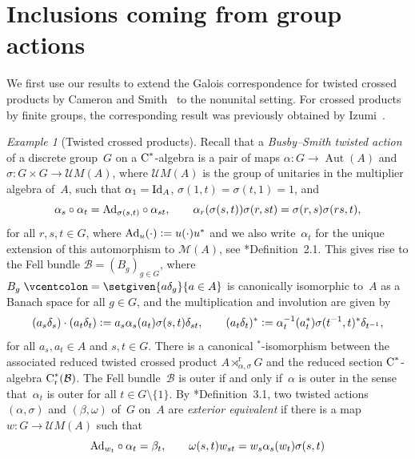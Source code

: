\documentclass[a4paper]{amsart}
\theoremstyle{plain}
\theoremstyle{definition}
\theoremstyle{remark}
\newtheorem{example}[theorem]{Example}
\numberwithin{theorem}{section}
\numberwithin{equation}{section}
\DeclareMathOperator{\Aut}{Aut}%
\newcommand*{\nb}{\nobreakdash}
\newcommand*{\Star}{\(^*\)\nobreakdash-}
\newcommand*{\red}{\mathrm{r}}%
\newcommand*{\Cst}{\textup C^*}%
\newcommand*{\Mult}{\mathcal M}%
\newcommand*{\UMult}{\mathcal UM}%
\newcommand*{\Id}{\textup{Id}}%
\newcommand*{\Ad}{\textup{Ad}}%
\newcommand*{\B}{\mathcal B}%
\newcommand*{\defeq}{\mathrel{\vcentcolon=}}%
\begin{document}
\section{Inclusions coming from group actions}
\label{sec:group_actions}

We first use our results to extend the Galois
correspondence for twisted crossed products by Cameron and
Smith~\cite{Cameron-Smith:Galois_reduced} to the nonunital setting.
For crossed products by finite groups, the corresponding result was
previously obtained by Izumi~\cite{Izumi:Inclusions_simple}.

\begin{example}[Twisted crossed products]
  \label{ex:twisted_actions}
  Recall that a \emph{Busby--Smith twisted action} of a discrete
  group~\(G\) on a \(\Cst\)\nb-algebra is a pair of maps
  \(\alpha\colon G\to \Aut(A)\) and \(\sigma\colon G\times G\to
  \UMult(A)\), where \(\UMult(A)\) is the group of unitaries in the
  multiplier algebra of~\(A\), such that \(\alpha_1=\Id_A\),
  \(\sigma(1,t)=\sigma(t,1)=1\), and
  \[
    \alpha_s\circ \alpha_t
    = \Ad_{\sigma(s,t)}\circ\alpha_{s t}, \qquad
    \alpha_r (\sigma(s,t)) \sigma(r,s t)
    =  \sigma(r,s) \sigma(rs,t),
  \]
  for all \(r,s,t\in G\), where \(\Ad_u(\cdot)\defeq u(\cdot)u^*\) and
  we also write~\(\alpha_t\) for the unique extension of this automorphism
  to \(\Mult(A)\), see
  \cite{Packer-Raeburn:Stabilisation}*{Definition~2.1}.
  This gives rise to the Fell bundle \(\B= (B_g)_{g\in G}\), where
  \(B_g\defeq \setgiven{a\delta_g}{a\in A}\) is canonically isomorphic
  to~\(A\) as a Banach space for all \(g\in G\), and the
  multiplication and involution are given by
  \[
    (a_{s}\delta_s) \cdot (a_t\delta_t)
    \defeq a_s \alpha_{s}(a_t)\sigma(s,t)\delta_{st}, \qquad
    (a_t\delta_t)^*
    \defeq \alpha^{-1}_t(a_t^*)\sigma(t^{-1},t)^*\delta_{t^{-1}},
  \]
  for all \(a_s,a_t\in A\) and \(s,t\in G\).
  There is a canonical \Star{}isomorphism between the associated
  reduced twisted crossed product \(A\rtimes^\red_{\alpha,\sigma} G\)
  and the reduced section \(\Cst\)\nb-algebra
  \(\Cst_\red(\B)\).
  The Fell bundle~\(\B\) is outer if and only if~\(\alpha\) is outer
  in the sense that~\(\alpha_t\) is outer for all \(t\in G\setminus
  \{1\}\).
  By \cite{Packer-Raeburn:Stabilisation}*{Definition~3.1}, two twisted
  actions \((\alpha,\sigma)\) and \((\beta,\omega)\)  of~\(G\)
  on~\(A\) are \emph{exterior equivalent} if  there is a map \(w\colon
  G\to \UMult(A)\) such that
  \[
    \Ad_{w_t}\circ \alpha_t=\beta_t, \qquad
    \omega(s,t)w_{st}=w_s\alpha_s(w_t)\sigma (s,t)
\]
\end{example}
\end{document}
